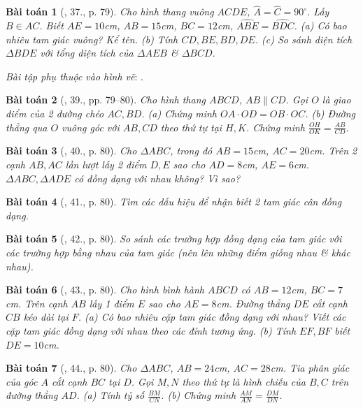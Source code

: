 \documentclass{article}
\newtheorem{baitoan}{Bài toán}
\begin{document}
\begin{baitoan}[\cite{SGK_Toan_8_tap_2}, 37., p. 79]
	Cho hình thang vuông $ACDE$, $\widehat{A} = \widehat{C} = 90^\circ$. Lấy $B\in AC$. Biết $AE = 10$\emph{cm}, $AB = 15$\emph{cm}, $BC = 12$\emph{cm}, $\widehat{ABE} = \widehat{BDC}$. (a) Có bao nhiêu tam giác vuông? Kể tên. (b) Tính $CD,BE,BD,DE$. (c) So sánh diện tích $\Delta BDE$ với tổng diện tích của $\Delta AEB$ \& $\Delta BCD$.
\end{baitoan}
\noindent\textit{Bài tập phụ thuộc vào hình vẽ}: \cite[38., p. 79]{SGK_Toan_8_tap_2}.

\begin{baitoan}[\cite{SGK_Toan_8_tap_2}, 39., pp. 79--80]
	Cho hình thang $ABCD$, $AB\parallel CD$. Gọi $O$ là giao điểm của 2 đường chéo $AC,BD$. (a) Chứng minh $OA\cdot OD = OB\cdot OC$. (b) Đường thẳng qua $O$ vuông góc với $AB,CD$ theo thứ tự tại $H,K$. Chứng minh $\frac{OH}{OK} = \frac{AB}{CD}$.
\end{baitoan}

\begin{baitoan}[\cite{SGK_Toan_8_tap_2}, 40., p. 80]
	Cho $\Delta ABC$, trong đó $AB = 15$\emph{cm}, $AC = 20$\emph{cm}. Trên 2 cạnh $AB,AC$ lần lượt lấy 2 điểm $D,E$ sao cho $AD = 8$\emph{cm}, $AE = 6$\emph{cm}. $\Delta ABC,\Delta ADE$ có đồng dạng với nhau không? Vì sao?	
\end{baitoan}

\begin{baitoan}[\cite{SGK_Toan_8_tap_2}, 41., p. 80]
	Tìm các dấu hiệu để nhận biết 2 tam giác cân đồng dạng.
\end{baitoan}

\begin{baitoan}[\cite{SGK_Toan_8_tap_2}, 42., p. 80]
	So sánh các trường hợp đồng dạng của tam giác với các trường hợp bằng nhau của tam giác (nên lên những điểm giống nhau \& khác nhau).
\end{baitoan}

\begin{baitoan}[\cite{SGK_Toan_8_tap_2}, 43., p. 80]
	Cho hình bình hành $ABCD$ có $AB = 12$\emph{cm}, $BC = 7$\emph{cm}. Trên cạnh $AB$ lấy 1 điểm $E$ sao cho $AE = 8$\emph{cm}. Đường thẳng $DE$ cắt cạnh $CB$ kéo dài tại $F$. (a) Có bao nhiêu cặp tam giác đồng dạng với nhau? Viết các cặp tam giác đồng dạng với nhau theo các đỉnh tương ứng. (b) Tính $EF,BF$ biết $DE = 10$\emph{cm}.
\end{baitoan}

\begin{baitoan}[\cite{SGK_Toan_8_tap_2}, 44., p. 80]
	Cho $\Delta ABC$, $AB = 24$\emph{cm}, $AC = 28$\emph{cm}. Tia phân giác của góc $A$ cắt cạnh $BC$ tại $D$. Gọi $M,N$ theo thứ tự là hình chiếu của $B,C$ trên đường thẳng $AD$. (a) Tính tỷ số $\frac{BM}{CN}$. (b) Chứng minh $\frac{AM}{AN} = \frac{DM}{DN}$.
\end{baitoan}
\end{document}
